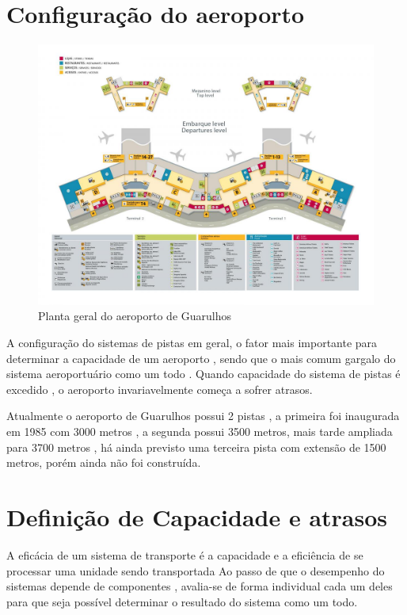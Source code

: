 \documentclass[12pt]{article}
\begin{document}
\section{Configuração do aeroporto}

\begin{figure}[b!]
  \centering
  \includegraphics[width=.9\textwidth]{aeroporto.png}
  \caption{Planta geral do aeroporto de Guarulhos}
  \label{fig:aeropoto}
\end{figure}

A configuração do sistemas de pistas em geral, o fator mais importante
para determinar a capacidade de um aeroporto , sendo que o mais comum 
gargalo do sistema aeroportuário como um todo . Quando capacidade do 
sistema de pistas é excedido , o aeroporto invariavelmente começa a 
sofrer atrasos.



Atualmente o aeroporto de Guarulhos possui 2 pistas , a primeira foi 
inaugurada em 1985 com  3000 metros , a segunda possui 3500 metros, 
mais tarde ampliada para 3700 metros , há ainda previsto uma terceira
pista com extensão de 1500 metros, porém ainda não foi construída. 


\section{Definição de Capacidade e atrasos}

A eficácia de um sistema de transporte é a capacidade e a eficiência de
se processar uma unidade sendo transportada Ao passo de que o desempenho
do sistemas depende de componentes , avalia-se de forma individual cada
um deles para que seja possível determinar o resultado do sistema como 
um todo. 
\end{document}
